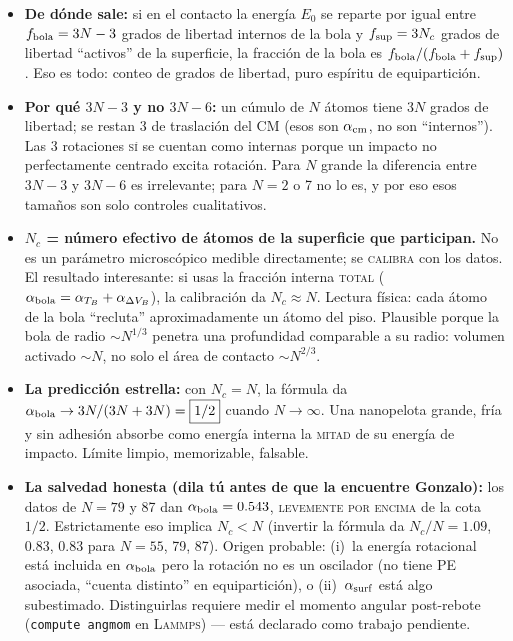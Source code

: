 \documentclass[11pt,a4paper]{article}
\newcommand{\lammps}{\textsc{Lammps}}
\begin{document}
\begin{itemize}[leftmargin=1.4em]
    \item \textbf{De dónde sale:} si en el contacto la energía $E_0$ se
    reparte por igual entre $f_{\rm bola}=3N-3$ grados de libertad
    internos de la bola y $f_{\rm sup}=3N_c$ grados de libertad
    ``activos'' de la superficie, la fracción de la bola es
    $f_{\rm bola}/(f_{\rm bola}+f_{\rm sup})$. Eso es todo: conteo de
    grados de libertad, puro espíritu de equipartición.
    \item \textbf{Por qué $3N-3$ y no $3N-6$:} un cúmulo de $N$ átomos
    tiene $3N$ grados de libertad; se restan 3 de traslación del CM
    (esos son $\alpha_{\rm cm}$, no son ``internos''). Las 3 rotaciones
    \textsc{sí} se cuentan como internas porque un impacto no
    perfectamente centrado excita rotación. Para $N$ grande la diferencia
    entre $3N-3$ y $3N-6$ es irrelevante; para $N=2$ o 7 no lo es, y por
    eso esos tamaños son solo controles cualitativos.
    \item \textbf{$N_c$ = número efectivo de átomos de la superficie que
    participan.} No es un parámetro microscópico medible directamente; se
    \textsc{calibra} con los datos. El resultado interesante: si usas la
    fracción interna \textsc{total}
    ($\alpha_{\rm bola}=\alpha_{T_B}+\alpha_{\Delta V_B}$), la
    calibración da $\boxed{N_c\approx N}$. Lectura física: cada átomo de
    la bola ``recluta'' aproximadamente un átomo del piso. Plausible
    porque la bola de radio $\sim N^{1/3}$ penetra una profundidad
    comparable a su radio: volumen activado $\sim N$, no solo el área de
    contacto $\sim N^{2/3}$.
    \item \textbf{La predicción estrella:} con $N_c=N$, la fórmula da
    $\alpha_{\rm bola}\to 3N/(3N+3N)=\boxed{1/2}$ cuando $N\to\infty$.
    Una nanopelota grande, fría y sin adhesión absorbe como energía
    interna la \textsc{mitad} de su energía de impacto. Límite limpio,
    memorizable, falsable.
    \item \textbf{La salvedad honesta (dila tú antes de que la encuentre
    Gonzalo):} los datos de $N=79$ y 87 dan $\alpha_{\rm bola}=0.543$,
    \textsc{levemente por encima} de la cota $1/2$. Estrictamente eso
    implica $N_c<N$ (invertir la fórmula da $N_c/N=1.09$, $0.83$, $0.83$
    para $N=55$, 79, 87). Origen probable: (i)~la energía rotacional está
    incluida en $\alpha_{\rm bola}$ pero la rotación no es un oscilador
    (no tiene PE asociada, ``cuenta distinto'' en equipartición), o
    (ii)~$\alpha_{\rm surf}$ está algo subestimado. Distinguirlas
    requiere medir el momento angular post-rebote (\texttt{compute
    angmom} en \lammps) --- está declarado como trabajo pendiente.
\end{itemize}
\end{document}
